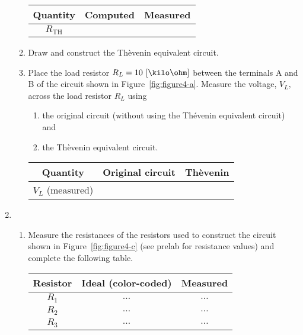 \begin{enumerate}
\begin{enumerate}
   \begin{center}
     \begin{tabular}{|c|c|c|}
       \toprule
       Quantity & Computed & Measured\\
       \toprule
       $R_{\mathrm{TH}}$ & & \\
       \bottomrule
     \end{tabular}     
   \end{center}



   
 \item Draw and construct the Th\`{e}venin equivalent circuit.


 \item Place the load resistor $R_L=10~[\kilo\ohm]$ between the terminals A and B of the circuit shown in Figure~\ref{fig:figure4-a}. Measure the voltage, $V_L,$ across the load resistor $R_L$ using
   \begin{enumerate}
   \item the original circuit (without using the Th\'evenin equivalent circuit) and 
     
   \item the Th\`{e}venin equivalent circuit. 
   \end{enumerate}
   \begin{center}
     \begin{tabular}{|c|c|c|}
       \toprule
       Quantity & Original circuit & Th\`{e}venin\\
       \toprule
       $V_L$ (measured) & & \\
       \bottomrule
     \end{tabular}     
   \end{center}


 \end{enumerate}
 
 \item 
 \begin{enumerate}
\item Measure the resistances of the resistors used to construct the circuit shown in Figure~\ref{fig:figure4-c} (see prelab for resistance values) and complete the following table.

  \begin{center}
    \begin{tabular}{c|c|c}
      \toprule
      Resistor &  Ideal (color-coded) & Measured\\
      \toprule
      $R_1$ & $\ldots$ & $\ldots$\\   %
      $R_2$ & $\ldots$ & $\ldots$\\   %
      $R_3$ & $\ldots$ & $\ldots$\\   %
      \bottomrule
    \end{tabular}    
  \end{center}


\end{enumerate}
\end{enumerate}
